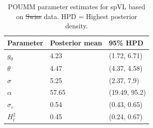 \documentclass[11pt]{article} %
\providecommand{\DIFadd}[1]{{\protect\color{blue}\uwave{#1}}} %
\providecommand{\DIFdel}[1]{{\protect\color{red}\sout{#1}}}                      %
\providecommand{\DIFaddFL}[1]{\DIFadd{#1}} %
\providecommand{\DIFdelFL}[1]{\DIFdel{#1}} %
\providecommand{\DIFaddbeginFL}{} %
\providecommand{\DIFaddendFL}{} %
\providecommand{\DIFdelbeginFL}{} %
\providecommand{\DIFdelendFL}{} %
\newcommand{\DIFscaledelfig}{0.5}
\newlength{\DIFdelgraphicswidth} %
\newlength{\DIFdelgraphicsheight} %
\newcommand{\DIFaddincludegraphics}[2][]{{\color{blue}\fbox{\DIFOincludegraphics[#1]{#2}}}} %
\newcommand{\DIFdelincludegraphics}[2][]{%
\sbox{\DIFdelgraphicsbox}{\DIFOincludegraphics[#1]{#2}}%
\settoboxwidth{\DIFdelgraphicswidth}{\DIFdelgraphicsbox} %
\settoboxtotalheight{\DIFdelgraphicsheight}{\DIFdelgraphicsbox} %
\scalebox{\DIFscaledelfig}{%
\parbox[b]{\DIFdelgraphicswidth}{\usebox{\DIFdelgraphicsbox}\\[-\baselineskip] \rule{\DIFdelgraphicswidth}{0em}}\llap{\resizebox{\DIFdelgraphicswidth}{\DIFdelgraphicsheight}{%
\setlength{\unitlength}{\DIFdelgraphicswidth}%
\begin{picture}(1,1)%
\thicklines\linethickness{2pt} %
{\color[rgb]{1,0,0}\put(0,0){\framebox(1,1){}}}%
{\color[rgb]{1,0,0}\put(0,0){\line( 1,1){1}}}%
{\color[rgb]{1,0,0}\put(0,1){\line(1,-1){1}}}%
\end{picture}%
}\hspace*{3pt}}} %
} %
\DeclareRobustCommand{\DIFaddbeginFL}{\DIFOaddbeginFL \let\includegraphics\DIFaddincludegraphics} %
\DeclareRobustCommand{\DIFaddendFL}{\DIFOaddendFL \let\includegraphics\DIFOincludegraphics} %
\DeclareRobustCommand{\DIFdelbeginFL}{\DIFOdelbeginFL \let\includegraphics\DIFdelincludegraphics} %
\DeclareRobustCommand{\DIFdelendFL}{\DIFOaddendFL \let\includegraphics\DIFOincludegraphics} %
\begin{document}
\newpage

\begin{table}[H]
\caption{POUMM parameter estimates for spVL based on \DIFdelbeginFL \DIFdelFL{Swiss }\DIFdelendFL \DIFaddbeginFL \DIFaddFL{SHCS }\DIFaddendFL data. HPD = Highest posterior density.}
	\begin{tabularx}{\linewidth}{XXX} \hline 
	Parameter & Posterior mean & 95\% HPD \\ \hline 
	${g_{0}}$ & 4.23 & (1.72, 6.71) \\
	$\theta$ & 4.47 & (4.37, 4.58) \\
	$\sigma$ & 5.25 & (2.37, 7.9) \\
	$\alpha$ & 57.65 & (19.49, 95.2) \\
	$\sigma_e$ & 0.54 & (0.43, 0.65) \\ 
	$H^2_{\bar{t}}$ & 0.45 & (0.24, 0.67) \\ \hline
	\end{tabularx}
	\label{tab:POUMM-parameters-our-estimates}
\end{table}
\end{document}
